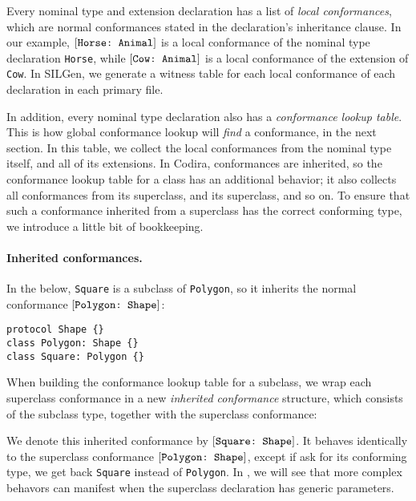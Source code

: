 \documentclass[../generics]{subfiles}
\begin{document}
Every nominal type and extension declaration has a list of \emph{local conformances}, which are normal conformances stated in the declaration's inheritance clause. In our example, $[\texttt{Horse:~Animal}]$ is a local conformance of the nominal type declaration \texttt{Horse}, while $[\texttt{Cow:~Animal}]$ is a local conformance of the extension of \texttt{Cow}. In SILGen, we generate a witness table for each local conformance of each declaration in each primary file.

In addition, every nominal type declaration also has a \emph{conformance lookup table}. This is how global conformance lookup will \emph{find} a conformance, in the next section. In this table, we collect the local conformances from the nominal type itself, and all of its extensions. In Codira, conformances are inherited, so the conformance lookup table for a class has an additional behavior; it also collects all conformances from its superclass, and its superclass, and so on. To ensure that such a conformance inherited from a superclass has the correct conforming type, we introduce a little bit of bookkeeping.

\paragraph{Inherited conformances.}
In the below, \texttt{Square} is a subclass of \texttt{Polygon}, so it inherits the normal conformance $[\texttt{Polygon:~Shape}]$:
\begin{Verbatim}
protocol Shape {}
class Polygon: Shape {}
class Square: Polygon {}
\end{Verbatim}
When building the conformance lookup table for a subclass, we wrap each superclass conformance in a new \emph{inherited conformance} structure, which consists of the subclass type, together with the superclass conformance:
\begin{center}
\end{center}
We denote this inherited conformance by $[\texttt{Square:~Shape}]$. It behaves identically to the superclass conformance $[\texttt{Polygon:~Shape}]$, except if ask for its conforming type, we get back \texttt{Square} instead of \texttt{Polygon}. In , we will see that more complex behavors can manifest when the superclass declaration has generic parameters.
\end{document}
